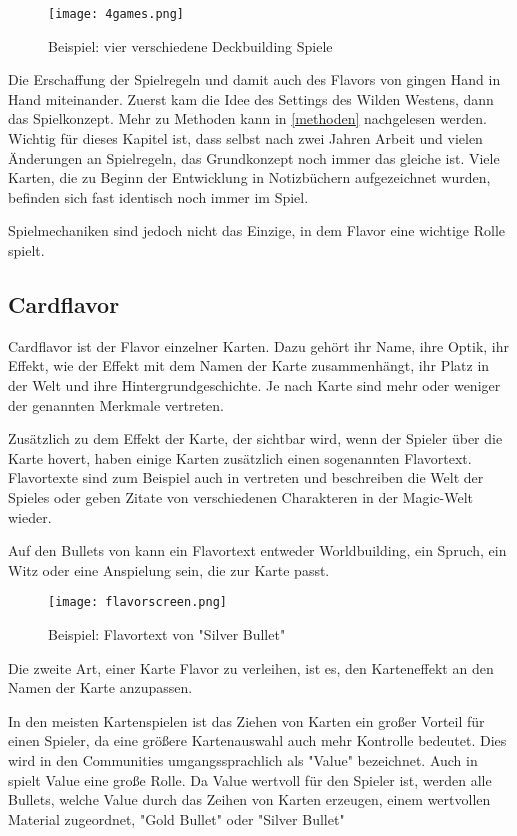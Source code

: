 \begin{figure}[H]
    \texttt{[image: 4games.png]}
    \caption{Beispiel: vier verschiedene Deckbuilding Spiele}
\end{figure}


Die Erschaffung der Spielregeln und damit auch des Flavors von \FF gingen Hand in Hand miteinander.
Zuerst kam die Idee des Settings des Wilden Westens, dann das Spielkonzept. Mehr zu Methoden kann in \ref{methoden}
nachgelesen werden. Wichtig für dieses Kapitel ist, dass selbst nach zwei Jahren Arbeit und vielen Änderungen an Spielregeln,
das Grundkonzept noch immer das gleiche ist. Viele Karten, die zu Beginn der Entwicklung in Notizbüchern aufgezeichnet wurden, befinden sich
fast identisch noch immer im Spiel.



Spielmechaniken sind jedoch nicht das Einzige, in dem Flavor eine wichtige Rolle spielt.

\subsection{Cardflavor}\label{subsec:cardflavor}

Cardflavor ist der Flavor einzelner Karten.
Dazu gehört ihr Name, ihre Optik, ihr Effekt, wie der Effekt mit dem Namen der Karte zusammenhängt,
ihr Platz in der Welt und ihre Hintergrundgeschichte. Je nach Karte sind mehr oder weniger der genannten
Merkmale vertreten.


Zusätzlich zu dem Effekt der Karte, der sichtbar wird, wenn der Spieler über die Karte hovert, haben einige Karten zusätzlich einen sogenannten Flavortext.
Flavortexte sind zum Beispiel auch in  vertreten und beschreiben die Welt der Spieles oder geben
Zitate von verschiedenen Charakteren in der Magic-Welt wieder.


Auf den Bullets von \FF kann ein Flavortext entweder Worldbuilding, ein Spruch, ein Witz oder eine Anspielung sein, die zur Karte passt.


\begin{figure}[H]
    \texttt{[image: flavorscreen.png]}
    \caption{Beispiel: Flavortext von "Silver Bullet"}
\end{figure}


Die zweite Art, einer Karte Flavor zu verleihen, ist es, den Karteneffekt an den Namen der Karte anzupassen.


In den meisten Kartenspielen ist das Ziehen von Karten ein großer Vorteil für einen Spieler, da eine größere Kartenauswahl
auch mehr Kontrolle bedeutet. Dies wird in den Communities umgangssprachlich als "Value" bezeichnet. 
Auch in \FF spielt Value eine große Rolle.
Da Value wertvoll für den Spieler ist, werden alle Bullets, welche Value durch das Zeihen von Karten erzeugen, einem
wertvollen Material zugeordnet, \zB "Gold Bullet" oder "Silver Bullet"

